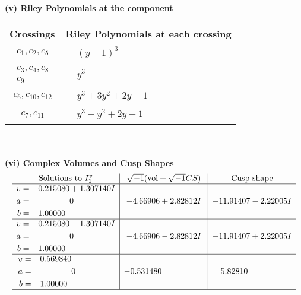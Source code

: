 \documentclass[1p]{elsarticle_modified}
\theoremstyle{definition}
\newcommand{\I}{\sqrt{-1}}
\begin{document}
\newpage\renewcommand{\arraystretch}{1}
\flushleft \textbf{(v) Riley Polynomials at the component}\newline \\
\begin{tabular}{m{50pt}|m{274pt}}
Crossings & \hspace{64pt}Riley Polynomials at each crossing \\
\hline $$\begin{aligned}c_{1},c_{2},c_{5}\end{aligned}$$&$\begin{aligned}
&(y-1)^3
\end{aligned}$\\
\hline $$\begin{aligned}c_{3},c_{4},c_{8}\\c_{9}\end{aligned}$$&$\begin{aligned}
&y^3
\end{aligned}$\\
\hline $$\begin{aligned}c_{6},c_{10},c_{12}\end{aligned}$$&$\begin{aligned}
&y^3+3 y^2+2 y-1
\end{aligned}$\\
\hline $$\begin{aligned}c_{7},c_{11}\end{aligned}$$&$\begin{aligned}
&y^3- y^2+2 y-1
\end{aligned}$\\
\hline
\end{tabular}\\~\\
\newpage\flushleft \textbf{(vi) Complex Volumes and Cusp Shapes}
$$\begin{array}{c|c|c}  
\text{Solutions to }I^v_{1}& \I (\text{vol} + \sqrt{-1}CS) & \text{Cusp shape}\\
 \hline 
\begin{aligned}
v &= \phantom{-}0.215080 + 1.307140 I \\
a &= \phantom{-0.000000 } 0 \\
b &= \phantom{-}1.00000\phantom{ +0.000000I}\end{aligned}
 & -4.66906 + 2.82812 I & -11.91407 - 2.22005 I \\ \hline\begin{aligned}
v &= \phantom{-}0.215080 - 1.307140 I \\
a &= \phantom{-0.000000 } 0 \\
b &= \phantom{-}1.00000\phantom{ +0.000000I}\end{aligned}
 & -4.66906 - 2.82812 I & -11.91407 + 2.22005 I \\ \hline\begin{aligned}
v &= \phantom{-}0.569840\phantom{ +0.000000I} \\
a &= \phantom{-0.000000 } 0 \\
b &= \phantom{-}1.00000\phantom{ +0.000000I}\end{aligned}
 & -0.531480\phantom{ +0.000000I} & \phantom{-}5.82810\phantom{ +0.000000I}\\
 \hline 
 \end{array}$$\newpage
\end{document}
